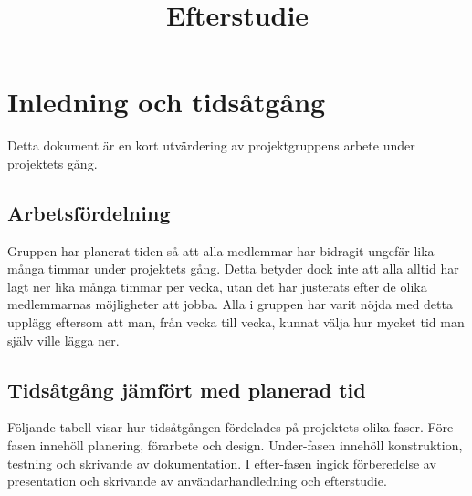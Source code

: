 \documentclass[a4paper,12pt]{article}
\title{Efterstudie}
\renewcommand{\thepage}{\roman{page}}
\begin{document}
\LIPStitelsida

\begin{LIPSprojektidentitet}
\end{LIPSprojektidentitet}


\renewcommand*\contentsname{Innehåll}
\begin{spacing}{0.5}
\tableofcontents{}
\end{spacing}
\newpage

\begin{LIPSdokumenthistorik}
\end{LIPSdokumenthistorik}
\newpage

\renewcommand{\thepage}{\arabic{page}}
\setcounter{page}{1}

\section{Inledning och tidsåtgång}
Detta dokument är en kort utvärdering av projektgruppens arbete under projektets gång.
\subsection{Arbetsfördelning}
Gruppen har planerat tiden så att alla medlemmar har bidragit ungefär lika många timmar under projektets gång. Detta betyder dock inte att alla alltid har lagt ner lika många timmar per vecka, utan det har justerats efter de olika medlemmarnas möjligheter att jobba. Alla i gruppen har varit nöjda med detta upplägg eftersom att man, från vecka till vecka, kunnat välja hur mycket tid man själv ville lägga ner.

\subsection{Tidsåtgång jämfört med planerad tid}
Följande tabell visar hur tidsåtgången fördelades på projektets olika faser. Före-fasen innehöll planering, förarbete och design. Under-fasen innehöll konstruktion, testning och skrivande av dokumentation. I efter-fasen ingick förberedelse av presentation och skrivande av användarhandledning och efterstudie.
\end{document}
